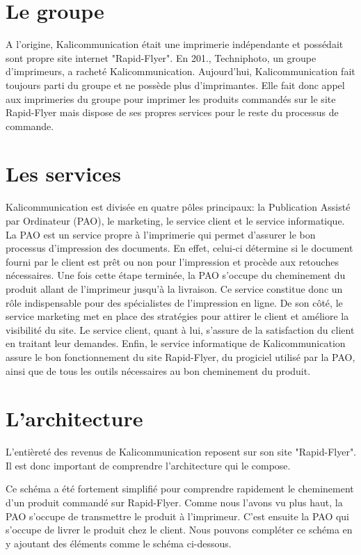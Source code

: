 
\section{Le groupe}
A l'origine, Kalicommunication était une imprimerie indépendante et possédait sont propre site internet "Rapid-Flyer".\newline
En 201., Techniphoto, un groupe d'imprimeurs, a racheté Kalicommunication. Aujourd'hui, Kalicommunication fait toujours parti du groupe et ne possède plus d'imprimantes. Elle fait donc appel aux imprimeries du groupe pour imprimer les produits commandés sur le site Rapid-Flyer mais dispose de ses propres services pour le reste du processus de commande.

\section{Les services}
Kalicommunication est divisée en quatre pôles principaux: la Publication Assisté par Ordinateur (PAO), le marketing, le service client et le service informatique.\newline
La PAO est un service propre à l'imprimerie qui permet d'assurer le bon processus d'impression des documents. En effet, celui-ci détermine si le document fourni par le client est prêt ou non pour l'impression et procède aux retouches nécessaires. Une fois cette étape terminée, la PAO s'occupe du cheminement du produit allant de l'imprimeur jusqu'à la livraison. Ce service constitue donc un rôle indispensable pour des spécialistes de l'impression en ligne.\newline
De son côté, le service marketing met en place des stratégies pour attirer le client et améliore la visibilité du site.
Le service client, quant à lui, s'assure de la satisfaction du client en traitant leur demandes.\newline
Enfin, le service informatique de Kalicommunication assure le bon fonctionnement du site Rapid-Flyer, du progiciel utilisé par la PAO, ainsi que de tous les outils nécessaires au bon cheminement du produit.

\section{L'architecture}
L'entièreté des revenus de Kalicommunication reposent sur son site "Rapid-Flyer". Il est donc important de comprendre l'architecture qui le compose.



Ce schéma a été fortement simplifié pour comprendre rapidement le cheminement d'un produit commandé sur Rapid-Flyer. Comme nous l'avons vu plus haut, la PAO s'occupe de transmettre le produit à l'imprimeur. C'est ensuite la PAO qui s'occupe de livrer le produit chez le client. Nous pouvons compléter ce schéma en y ajoutant des éléments comme le schéma ci-dessous.



